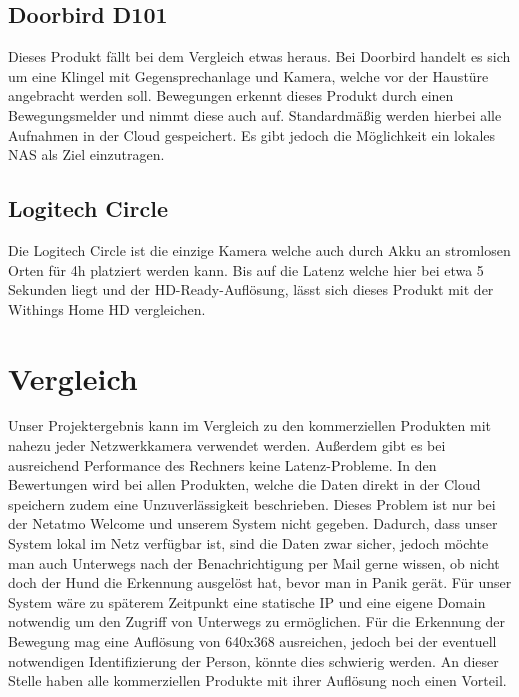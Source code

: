 \subsection{Doorbird D101}
Dieses Produkt fällt bei dem Vergleich etwas heraus. Bei Doorbird handelt es sich um eine Klingel mit Gegensprechanlage und Kamera, welche vor der Haustüre angebracht werden soll. Bewegungen erkennt dieses Produkt durch einen Bewegungsmelder und nimmt diese auch auf. Standardmäßig werden hierbei alle Aufnahmen in der Cloud gespeichert. Es gibt jedoch die Möglichkeit ein lokales NAS als Ziel einzutragen.

\subsection{Logitech Circle}
Die Logitech Circle ist die einzige Kamera welche auch durch Akku an stromlosen Orten für 4h platziert werden kann. Bis auf die Latenz welche hier bei etwa 5 Sekunden liegt und der HD-Ready-Auflösung, lässt sich dieses Produkt mit der Withings Home HD vergleichen. 

\section{Vergleich}
Unser Projektergebnis kann im Vergleich zu den kommerziellen Produkten mit nahezu jeder Netzwerkkamera verwendet werden. Außerdem gibt es bei ausreichend Performance des Rechners keine Latenz-Probleme. In den Bewertungen wird bei allen Produkten, welche die Daten direkt in der Cloud speichern zudem eine Unzuverlässigkeit beschrieben. Dieses Problem ist nur bei der Netatmo Welcome und unserem System nicht gegeben. Dadurch, dass unser System lokal im Netz verfügbar ist, sind die Daten zwar sicher, jedoch möchte man auch Unterwegs nach der Benachrichtigung per Mail gerne wissen, ob nicht doch der Hund die Erkennung ausgelöst hat, bevor man in Panik gerät. Für unser System wäre zu späterem Zeitpunkt eine statische IP und eine eigene Domain notwendig um den Zugriff von Unterwegs zu ermöglichen. Für die Erkennung der Bewegung mag eine Auflösung von 640x368 ausreichen, jedoch bei der eventuell notwendigen Identifizierung der Person, könnte dies schwierig werden. An dieser Stelle haben alle kommerziellen Produkte mit ihrer Auflösung noch einen Vorteil.